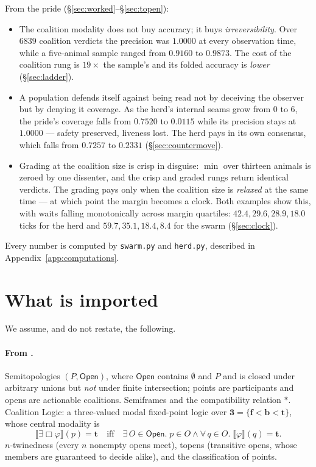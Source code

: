\documentclass[11pt,a4paper]{article}
\theoremstyle{plain}
\theoremstyle{definition}
\theoremstyle{remark}
\newcommand{\Open}{\mathsf{Open}}
\newcommand{\Ebox}{\exists\Box}
\newcommand{\sem}[1]{\llbracket #1 \rrbracket}
\newcommand{\tv}{\mathbf{t}}
\newcommand{\fv}{\mathbf{f}}
\newcommand{\bv}{\mathbf{b}}
\begin{document}
\noindent From the pride (\S\ref{sec:worked}--\S\ref{sec:topen}):
\begin{itemize}[leftmargin=1.4em]
\item The coalition modality does not buy accuracy; it buys
      \emph{irreversibility}. Over $6839$ coalition verdicts the precision was
      $1.0000$ at every observation time, while a five-animal sample ranged
      from $0.9160$ to $0.9873$. The cost of the coalition rung is $19\times$
      the sample's and its folded accuracy is \emph{lower}
      (\S\ref{sec:ladder}).
\item A population defends itself against being read not by deceiving the
      observer but by denying it coverage. As the herd's internal seams grow
      from $0$ to $6$, the pride's coverage falls from $0.7520$ to $0.0115$
      while its precision stays at $1.0000$ --- safety preserved, liveness
      lost. The herd pays in its own consensus, which falls from $0.7257$ to
      $0.2331$ (\S\ref{sec:countermove}).
\item Grading at the coalition size is crisp in disguise: $\min$ over thirteen
      animals is zeroed by one dissenter, and the crisp and graded rungs return
      identical verdicts. The grading pays only when the coalition size is
      \emph{relaxed} at the same time --- at which point the margin becomes a
      clock. Both examples show this, with waits falling monotonically across
      margin quartiles: $42.4, 29.6, 28.9, 18.0$ ticks for the herd and
      $59.7, 35.1, 18.4, 8.4$ for the swarm (\S\ref{sec:clock}).
\end{itemize}

Every number is computed by \texttt{swarm.py} and \texttt{herd.py}, described
in Appendix~\ref{app:computations}.

\section{What is imported}\label{sec:imported}

We assume, and do not restate, the following.

\paragraph{From \cite{consensus}.} Semitopologies $(P,\Open)$, where $\Open$
contains $\emptyset$ and $P$ and is closed under arbitrary unions but
\emph{not} under finite intersection; points are participants and opens are
actionable coalitions. Semiframes and the compatibility relation $*$. Coalition
Logic: a three-valued modal fixed-point logic over $\mathbf{3} = \{\fv < \bv <
\tv\}$, whose central modality is
\[
  \sem{\Ebox\varphi}(p) = \tv \quad\text{iff}\quad \exists\,O\in\Open.\;
  p\in O \wedge \forall\,q\in O.\; \sem{\varphi}(q) = \tv .
\]
$n$-twinedness (every $n$ nonempty opens meet), topens (transitive opens, whose
members are guaranteed to decide alike), and the classification of points.
\end{document}
